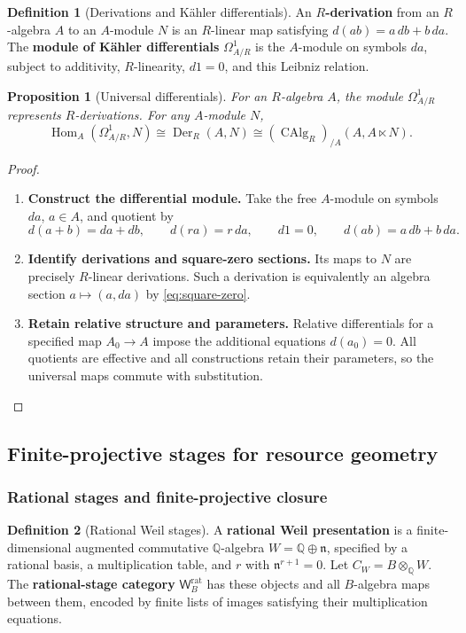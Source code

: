 \documentclass[11pt,a4paper]{article}
\numberwithin{algorithm}{section}
\numberwithin{equation}{section}
\newtheorem{proposition}[proposition]{Proposition}
\theoremstyle{definition}
\newtheorem{definition}[definition]{Definition}
\theoremstyle{remark}
\theoremstyle{plain}
\newcommand{\QQ}{\mathbb Q}
\newcommand{\CAlg}{\operatorname{CAlg}}
\newcommand{\Hom}{\operatorname{Hom}}
\newcommand{\Der}{\operatorname{Der}}
\newcommand{\Weil}{\mathsf W}
\theoremstyle{definition}
\theoremstyle{plain}
\begin{document}
\begin{definition}[Derivations and K\"ahler differentials]\label{def:kahler-differentials}
An \textbf{$R$-derivation} from an $R$-algebra $A$ to an $A$-module
$N$ is an $R$-linear map satisfying $d(ab)=a\,db+b\,da$.
The \textbf{module of K\"ahler differentials} $\Omega^1_{A/R}$ is
the $A$-module on symbols $da$, subject to additivity, $R$-linearity,
$d1=0$, and this Leibniz relation.
\end{definition}

\begin{proposition}[Universal differentials]\label{prop:kahler}
For an $R$-algebra $A$, the module $\Omega^1_{A/R}$ represents
$R$-derivations. For any $A$-module $N$,
\[
 \Hom_A(\Omega^1_{A/R},N)
 \cong\Der_R(A,N)
 \cong(\CAlg_R)_{/A}(A,A\ltimes N).
\]
\end{proposition}
\begin{proof}\leavevmode
\begin{enumerate}[leftmargin=*,align=left]
\item \textbf{Construct the differential module.}
Take the free $A$-module on symbols $da$, $a\in A$, and quotient by
\[
 d(a+b)=da+db,\qquad d(ra)=r\,da,\qquad
 d1=0,\qquad d(ab)=a\,db+b\,da.
\]

\item \textbf{Identify derivations and square-zero sections.}
Its maps to $N$ are precisely $R$-linear derivations. Such a derivation
is equivalently an algebra section $a\mapsto(a,da)$ by
\eqref{eq:square-zero}.

\item \textbf{Retain relative structure and parameters.}
Relative differentials for a specified map
$A_0\to A$ impose the additional equations $d(a_0)=0$.
All quotients are effective and all constructions retain their
parameters, so the universal maps commute with substitution.
\end{enumerate}
\end{proof}

\subsection{Finite-projective stages for resource geometry}
\label{sec:weil}
\subsubsection{Rational stages and finite-projective closure}


\begin{definition}[Rational Weil stages]\label{def:rational-weil-stages}
A \textbf{rational Weil presentation} is a finite-dimensional augmented commutative
$\QQ$-algebra $W=\QQ\oplus\mathfrak n$, specified by a rational basis,
a multiplication table, and $r$ with $\mathfrak n^{r+1}=0$.
Let $C_W=B\otimes_\QQ W$.  The \textbf{rational-stage category}
$\Weil_B^{\mathrm{rat}}$ has these objects and all $B$-algebra maps
between them, encoded by finite lists of images satisfying their
multiplication equations.
\end{definition}
\end{document}
